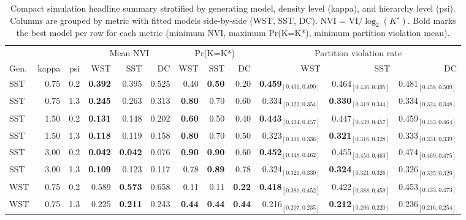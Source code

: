 \begin{table}[!h]
\centering
\caption{Compact simulation headline summary stratified by generating model, density level (kappa), and hierarchy level (psi). Columns are grouped by metric with fitted models side-by-side (WST, SST, DC). NVI = VI$/\log_2(K^\star)$. Bold marks the best model per row for each metric (minimum NVI, maximum Pr(K=K*), minimum partition violation mean).\\\label{tab:sim-headline-compact}}
\centering
\begin{tabular}[t]{lrrrrrrrrrrr}
\toprule
\multicolumn{3}{c}{ } & \multicolumn{3}{c}{Mean NVI} & \multicolumn{3}{c}{Pr(K=K*)} & \multicolumn{3}{c}{Partition violation rate} \\
\cmidrule(l{3pt}r{3pt}){4-6} \cmidrule(l{3pt}r{3pt}){7-9} \cmidrule(l{3pt}r{3pt}){10-12}
Gen. & kappa & psi & WST & SST & DC & WST & SST & DC & WST & SST & DC\\
\midrule
SST & 0.75 & 0.2 & \textbf{0.392} & 0.395 & 0.525 & 0.40 & \textbf{0.50} & 0.20 & \textbf{0.459$_{[0.431,0.490]}$} & 0.464$_{[0.436,0.495]}$ & 0.481$_{[0.458,0.509]}$\\
SST & 0.75 & 1.3 & \textbf{0.245} & 0.263 & 0.313 & \textbf{0.80} & 0.70 & 0.60 & 0.334$_{[0.322,0.354]}$ & \textbf{0.330$_{[0.319,0.344]}$} & 0.334$_{[0.324,0.348]}$\\
SST & 1.50 & 0.2 & \textbf{0.131} & 0.148 & 0.202 & \textbf{0.60} & 0.50 & 0.40 & \textbf{0.443$_{[0.434,0.457]}$} & 0.447$_{[0.439,0.457]}$ & 0.459$_{[0.453,0.464]}$\\
SST & 1.50 & 1.3 & \textbf{0.118} & 0.119 & 0.158 & \textbf{0.80} & 0.70 & 0.50 & 0.323$_{[0.311,0.336]}$ & \textbf{0.321$_{[0.316,0.328]}$} & 0.333$_{[0.331,0.339]}$\\
SST & 3.00 & 0.2 & \textbf{0.042} & \textbf{0.042} & 0.076 & \textbf{0.90} & \textbf{0.90} & 0.60 & \textbf{0.452$_{[0.448,0.462]}$} & 0.455$_{[0.450,0.463]}$ & 0.474$_{[0.469,0.475]}$\\
SST & 3.00 & 1.3 & \textbf{0.109} & 0.123 & 0.117 & 0.78 & \textbf{0.89} & 0.78 & 0.324$_{[0.321,0.330]}$ & \textbf{0.324$_{[0.321,0.326]}$} & 0.326$_{[0.325,0.329]}$\\
WST & 0.75 & 0.2 & 0.589 & \textbf{0.573} & 0.658 & 0.11 & 0.11 & \textbf{0.22} & \textbf{0.418$_{[0.387,0.452]}$} & 0.422$_{[0.388,0.459]}$ & 0.453$_{[0.433,0.473]}$\\
WST & 0.75 & 1.3 & 0.225 & \textbf{0.211} & 0.243 & \textbf{0.44} & \textbf{0.44} & \textbf{0.44} & 0.216$_{[0.207,0.235]}$ & \textbf{0.212$_{[0.206,0.220]}$} & 0.236$_{[0.216,0.254]}$\\

\end{tabular}
\end{table}

